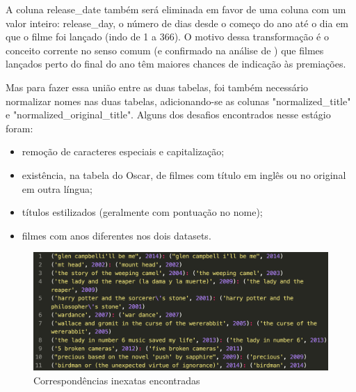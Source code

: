             A coluna release\_date também será eliminada em favor de uma coluna com um valor inteiro: release\_day, o número de dias desde o começo do ano até o dia em que o filme foi lançado (indo de 1 a 366). O motivo dessa transformação é o conceito corrente no senso comum (e confirmado na análise de ) que filmes lançados perto do final do ano têm maiores chances de indicação às premiações.

            Mas para fazer essa união entre as duas tabelas, foi também necessário normalizar nomes nas duas tabelas, adicionando-se as colunas "normalized\_title" e "normalized\_original\_title". Alguns dos desafios encontrados nesse estágio foram:

            \begin{itemize}
                \item remoção de caracteres especiais e capitalização;
                \item existência, na tabela do Oscar, de filmes com título em inglês ou no original em outra língua;
                \item títulos estilizados (geralmente com pontuação no nome);
                \item filmes com anos diferentes nos dois datasets.
            \end{itemize}

            \begin{figure}[htb]
            	\caption{\label{corresp}Correspondências inexatas encontradas}
            	\begin{center}
            		\includegraphics[scale=0.35]{corresp.png}
            	\end{center}
            \end{figure}
            
